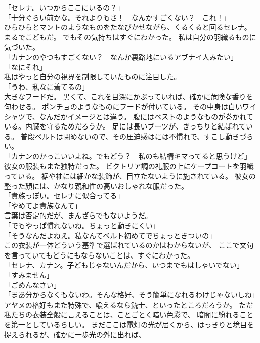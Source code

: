 \documentclass[../IHMain]{subfiles}
\begin{document}
「セレナ。いつからここにいるの？」\\
「十分ぐらい前かな。それよりもさ！　なんかすごくない？　これ！」\\
ひらひらとマントのようなものをたなびかせながら、くるくると回るセレナ。
まるでこどもだ。
でもその気持ちはすぐにわかった。
私は自分の羽織るものに気づいた。\\
「カナンのやつもすごくない？　なんか裏路地にいるアブナイ人みたい」\\
「なにそれ」\\
私はやっと自分の視界を制限していたものに注目した。\\
「うわ、私なに着てるの」\\
大きなフードだ。
黒くて、これを目深にかぶっていれば、確かに危険な香りを匂わせる。
ポンチョのようなものにフードが付いている。
その中身は白いワイシャツで、なんだかイメージとは違う。
腹にはベストのようなものが巻かれている。内臓を守るためだろうか。
足には長いブーツが、ぎっちりと結ばれている。
普段ベルトは閉めないので、その圧迫感はには不慣れで、すこし動きづらい。\\
「カナンのかっこいいよね。でもどう？　私のも結構キマってると思うけど」\\
彼女の服装もまた独特だった。
ビクトリア調の礼服の上にケープコートを羽織っている。
裾や袖には細かな装飾が、目立たないように施されている。
彼女の整った顔には、かなり親和性の高いおしゃれな服だった。\\
「貴族っぽい。セレナに似合ってる」\\
「やめてよ貴族なんて」\\
言葉は否定的だが、まんざらでもないようだ。\\
「でもやっぱ慣れないね。ちょっと動きにくい」\\
「そうなんだよねえ。私なんてベルト初めてでちょっときついの」\\
この衣装が一体どういう基準で選ばれているのかはわからないが、
ここで文句を言っていてもどうにもならないことは、すぐにわかった。\\
「セレナ、カナン。子どもじゃないんだから、いつまでもはしゃいでない」\\
「すみません」\\
「ごめんなさい」\\
「まあ分からなくもないわ。そんな格好、そう簡単になれるわけじゃないしね」\\
アヤメの格好もまた特殊で、喩えるなら銃士、といったところだろうか。
ただ私たちの衣装全般に言えることは、ことごとく暗い色彩で、
暗闇に紛れることを第一としているらしい。
まだここは電灯の光が届くから、はっきりと境目を捉えられるが、確かに一歩光の外に出れば、
\end{document}
